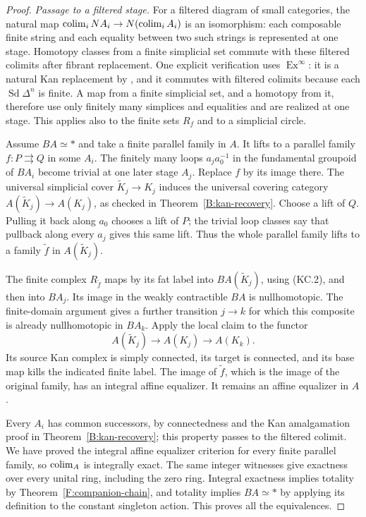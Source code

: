 \begin{proof}
\emph{Passage to a filtered stage.}
For a filtered diagram of small categories, the natural map
$\operatorname*{colim}_i N A_i\to N(\operatorname*{colim}_i A_i)$ is an isomorphism: each
composable finite string and each equality between two such strings
is represented at one stage. Homotopy classes from a finite
simplicial set commute with these filtered colimits after fibrant
replacement. One explicit verification uses $\operatorname{Ex}^\infty$:
it is a natural Kan replacement by
\cite[Theorem III.4.8, p.~188]{ABGoerssJardine}, and it commutes
with filtered colimits because each $\operatorname{Sd}\Delta^n$
is finite. A map from a finite simplicial set, and a homotopy from
it, therefore use only finitely many simplices and equalities and
are realized at one stage. This applies also to the finite sets
$R_f$ and to a simplicial circle.

Assume $BA\simeq *$ and take a finite parallel family in $A$.
It lifts to a parallel family $f:P\rightrightarrows Q$ in some
$A_i$. The finitely many loops $a_j a_0^{-1}$ in the fundamental
groupoid of $BA_i$ become trivial at one later stage $A_j$.
Replace $f$ by its image there. The universal simplicial cover
$\widetilde K_j\to K_j$ induces the universal covering category
$A(\widetilde K_j)\to A(K_j)$, as checked in
Theorem~\ref{B:kan-recovery}. Choose a lift of $Q$. Pulling it back
along $a_0$ chooses a lift of $P$; the trivial loop classes say that
pullback along every $a_j$ gives this same lift. Thus the whole
parallel family lifts to a family $\widetilde f$ in
$A(\widetilde K_j)$.

The finite complex $R_{\widetilde f}$ maps by its fat label into
$BA(\widetilde K_j)$, using (KC.2), and then into $BA_j$.
Its image in the weakly contractible $BA$ is nullhomotopic.
The finite-domain argument gives a further transition $j\to k$
for which this composite is already nullhomotopic in $BA_k$.
Apply the local claim to the functor
\[
 A(\widetilde K_j)\longrightarrow A(K_j)
       \longrightarrow A(K_k).
\]
Its source Kan complex is simply connected, its target is connected,
and its base map kills the indicated finite label. The image of
$\widetilde f$, which is the image of the original family, has an
integral affine equalizer. It remains an affine equalizer in $A$.

Every $A_i$ has common successors, by connectedness and the Kan
amalgamation proof in Theorem~\ref{B:kan-recovery}; this property
passes to the filtered colimit. We have proved the integral affine
equalizer criterion for every finite parallel family, so $\operatorname*{colim}_A$
is integrally exact. The same integer witnesses give exactness over
every unital ring, including the zero ring. Integral exactness
implies totality by Theorem~\ref{F:companion-chain}, and totality
implies $BA\simeq *$ by applying its definition to the constant
singleton action. This proves all the equivalences.
\end{proof}
